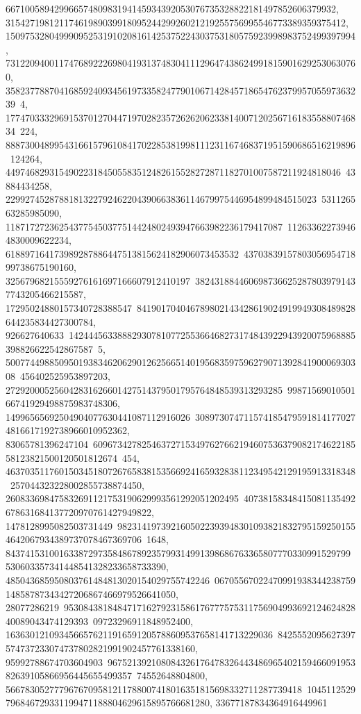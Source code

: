 {{{   66710058942996657480983194145934392053076735328822181497852606379932, 
   3154271981211746198903991809524429926021219255756995546773389359375412, 
   150975328049990952531910208161425375224303753180575923998983752499397994, 
   7312209400117476892226980419313748304111296474386249918159016292530630760, 
   35823778870416859240934561973358247790106714284571865476237995705597363239\
4, 
   17747033329691537012704471970282357262620623381400712025671618355880746834\
224, 888730048995431661579610841702285381998111231167468371951590686516219896\
124264, 449746829315490223184505583512482615528272871182701007587211924818046\
43884434258, 2299274528788181322792462204390663836114679975446954899484515023\
531126563285985090, 118717272362543775450377514424802493947663982236179417087\
112633622739464830009622234, 618897164173989287886447513815624182906073453532\
4370383915780305695471899738675190160, 32567968215559276161697166607912410197\
3824318844606987366252878039791437743205466215587, 17295024880157340728388547\
841901704046789802143428619024919949308489828644235834427300784, 926627640633\
14244456338882930781077255366468273174843922943920075968885398826622542867587\
5, 50077449885095019383462062901262566514019568359759627907139284190006930308\
456402525953897203, 272920005256042831626601427514379501795764848539313293285\
9987156901050166741929498875983748306, 14996565692504904077630441087112916026\
3089730747115741854795918141770274816617192738966010952362, 83065781396247104\
60967342782546372715349762766219460753637908217462218558123821500120501812674\
454, 463703511760150345180726765838153566924165932838112349542129195913318348\
257044323228002855738874450, 260833698475832691121753190629993561292051202495\
40738158348415081135492678631684137720970761427949822, 1478128995082503731449\
98231419739216050223939483010938218327951592501554642067934389737078467369706\
1648, 84374153100163387297358486789235799314991398686763365807770330991529799\
530603357341448541328233658733390, 485043685950803761484813020154029755742246\
0670556702247099193834423875914858787343427206867466979526641050, 28077286219\
95308438184847171627923158617677757531175690499369212462482840089043474129393\
09723296911848952400, 1636301210934566576211916591205788609537658141713229036\
8425552095627397574737233074737802821991902457761338160, 95992788674703604903\
96752139210808432617647832644348696540215946609195382639105866956445655499357\
74552648804800, 5667830527779676709581211788007418016351815698332711287739418\
1045112529796846729331199471188804629615895766681280, 33677187834364916449961\
}}}
